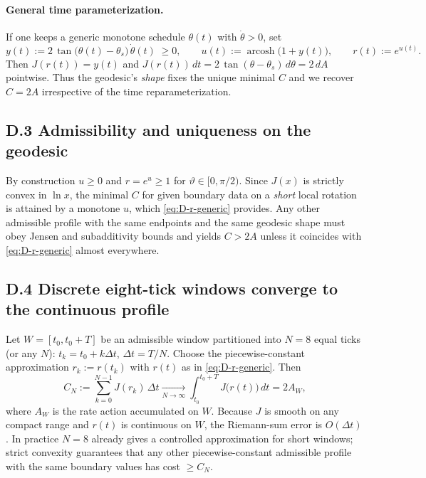 \documentclass[11pt,letterpaper]{article}
\begin{document}
\paragraph{General time parameterization.}
If one keeps a generic monotone schedule \(\theta(t)\) with \(\dot\theta>0\), set
\begin{equation}
y(t):=2\,\tan\bigl(\theta(t)-\theta_s\bigr)\,\dot\theta(t)\;\ge 0,\qquad
u(t):=\operatorname{arcosh}\!\bigl(1+y(t)\bigr),\qquad
r(t):=e^{u(t)}.
\label{eq:D-r-generic}
\end{equation}
Then \(J(r(t))=y(t)\) and \(J(r(t))\,dt=2\,\tan(\theta-\theta_s)\,d\theta=2\,dA\) pointwise. Thus the geodesic’s \emph{shape} fixes the unique minimal \(C\) and we recover \(C=2A\) irrespective of the time reparameterization.

\subsection*{D.3 Admissibility and uniqueness on the geodesic}

By construction \(u\ge 0\) and \(r=e^u\ge 1\) for \(\vartheta\in[0,\pi/2)\). Since \(J(x)\) is strictly convex in \(\ln x\), the minimal \(C\) for given boundary data on a \emph{short} local rotation is attained by a monotone \(u\), which \eqref{eq:D-r-generic} provides. Any other admissible profile with the same endpoints and the same geodesic shape must obey Jensen and subadditivity bounds and yields \(C>2A\) unless it coincides with \eqref{eq:D-r-generic} almost everywhere.

\subsection*{D.4 Discrete eight-tick windows converge to the continuous profile}

Let \(W=[t_0,t_0+T]\) be an admissible window partitioned into \(N=8\) equal ticks (or any \(N\)): \(t_k=t_0+k\Delta t\), \(\Delta t=T/N\). Choose the piecewise-constant approximation \(r_k:=r(t_k)\) with \(r(t)\) as in \eqref{eq:D-r-generic}. Then
\[
C_N:=\sum_{k=0}^{N-1} J(r_k)\,\Delta t \xrightarrow[N\to\infty]{} \int_{t_0}^{t_0+T} J\!\bigl(r(t)\bigr)\,dt = 2A_W,
\]
where \(A_W\) is the rate action accumulated on \(W\). Because \(J\) is smooth on any compact range and \(r(t)\) is continuous on \(W\), the Riemann-sum error is \(O(\Delta t)\). In practice \(N=8\) already gives a controlled approximation for short windows; strict convexity guarantees that any other piecewise-constant admissible profile with the same boundary values has cost \(\ge C_N\).
\end{document}
